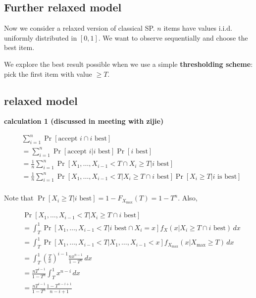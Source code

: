
\subsection{Further relaxed model}
Now we consider a relaxed version of classical SP. $n$ items have values i.i.d. uniformly distributed in $[0,1]$. We want to observe sequentially and choose the best item. 

We explore the best result possible when we use a simple \textbf{thresholding scheme}: pick the first item with value $\ge T$.

\subsection{relaxed model}
\textbf{calculation 1 (discussed in meeting with zijie)}

\begin{align*}
&\sum_{i=1}^n \operatorname{Pr}\left[{\text{accept }i \cap i \text{ best}}\right]\\
&= \sum_{i=1}^n \operatorname{Pr}\left[{\text{accept }i | i \text{ best}}\right]\operatorname{Pr}\left[{i \text{ best}}\right]\\
&= \frac{1}{n}\sum_{i=1}^n \operatorname{Pr}\left[{X_1,\dots,X_{i-1}<T \cap X_i \geq T | i \text{ best}}\right]\\
&= \frac{1}{n}\sum_{i=1}^n \operatorname{Pr}\left[{X_1,\dots,X_{i-1}<T | X_i \geq T \cap i \text{ best}}\right]\operatorname{Pr}\left[{X_i \geq T | i\text{ is best}}\right]\\ 
\end{align*}

Note that $\operatorname{Pr}\left[{X_i \geq T | i \text{ best}}\right] = 1-F_{X_{\max}}(T) = 1-T^n$. Also,

\begin{align*}
&\operatorname{Pr}\left[{X_1,\dots,X_{i-1}<T | X_i \geq T \cap i \text{ best}}\right]\\
&= \int_{T}^1 \operatorname{Pr}\left[{X_1,\dots,X_{i-1}<T | i \text{ best} \cap X_i = x}\right]f_{X}(x | X_i \geq T \cap i \text{ best})\,dx\\
&= \int_{T}^1 \operatorname{Pr}\left[{X_1,\dots,X_{i-1}<T | X_1,\dots,X_{i-1}<x}\right]f_{X_{\max}}(x | X_{\max}\geq T)\,dx\\
&= \int_{T}^1 {\left(\frac{T}{x}\right)}^{i-1} \frac{nx^{n-1}}{1-T^{n}} \,dx\\
&= \frac{nT^{i-1}}{1-T^{n}}\int_{T}^1  x^{n-i} \,dx\\
&= \frac{nT^{i-1}}{1-T^{n}} \frac{1-T^{n-i+1}}{n-i+1}
\end{align*}

